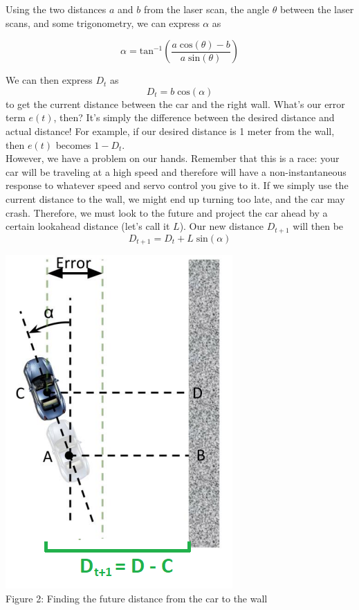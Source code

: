 \documentclass[a4 paper]{article}
\begin{document}
Using the two distances $a$ and $b$ from the laser scan, the angle $\theta$ between the laser scans, and some trigonometry, we can express $\alpha$ as

\begin{equation}
\label{eq:alpha}
\alpha = \mbox{tan}^{-1}\left(\frac{a \; \mbox{cos}(\theta) - b}{a \; \mbox{sin}(\theta)}\right)
\end{equation}

We can then express $D_t$ as 
\begin{equation*}
D_t = b \; \mbox{cos}(\alpha)
\end{equation*}
to get the current distance between the car and the right wall. What's our error term $e(t)$, then? It's simply the difference between the desired distance and actual distance! For example, if our desired distance is 1 meter from the wall, then $e(t)$ becomes $1 - D_t$.\\

However, we have a problem on our hands. Remember that this is a race: your car will be traveling at a high speed and therefore will have a non-instantaneous response to whatever speed and servo control you give to it. If we simply use the current distance to the wall, we might end up turning too late, and the car may crash. Therefore, we must look to the future and project the car ahead by a certain lookahead distance (let's call it $L$). Our new distance $D_{t+1}$ will then be
\begin{equation*}
D_{t+1} = D_t + L \; \mbox{sin}(\alpha)
\end{equation*}

\begin{center}
	\includegraphics[scale=0.75]{wall_following_lab_figure_2.png}\\
	\label{fig:fig2}
	Figure 2: Finding the future distance from the car to the wall
\end{center}
\end{document}

